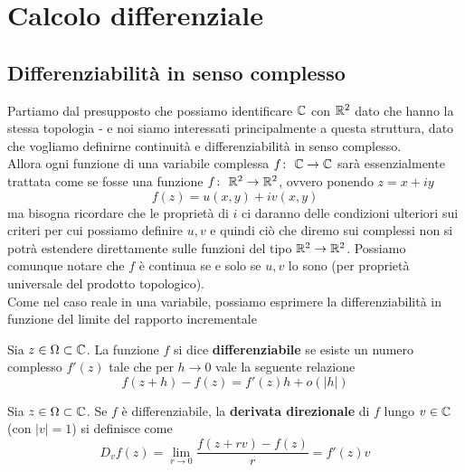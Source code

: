 \chapter{Calcolo differenziale}

\section{Differenziabilità in senso complesso}

Partiamo dal presupposto che possiamo identificare $\mathbb{C}$ con $\mathbb{R}^2$ dato che hanno la stessa topologia - e noi siamo interessati principalmente a questa struttura, dato che vogliamo definirne continuità e  differenziabilità in senso complesso. \\ Allora ogni funzione di una variabile complessa $f \colon\ \mathbb{C} \rightarrow \mathbb{C}$ sarà essenzialmente trattata come se fosse una funzione $f \colon\ \mathbb{R}^2 \rightarrow \mathbb{R}^2$, ovvero ponendo $z = x + iy$
\begin{equation}
	f(z) = u(x,y) + iv(x,y)
\end{equation}
ma bisogna ricordare che le proprietà di $i$ ci daranno delle condizioni ulteriori sui criteri per cui possiamo definire $u, v$ e quindi ciò che diremo sui complessi non si potrà estendere direttamente sulle funzioni del tipo $\mathbb{R}^2 \to \mathbb{R}^2$. Possiamo comunque notare che $f$ è continua se e solo se $u,v$ lo sono (per proprietà universale del prodotto topologico).\\

Come nel caso reale in una variabile, possiamo esprimere la differenziabilità in funzione del limite del rapporto incrementale

\begin{definition}
	Sia $z \in \Omega \subset \mathbb{C}$. La funzione $f$ si dice \textbf{differenziabile} se esiste un numero complesso $f'(z)$ tale che per $h \to 0$ vale la seguente relazione
	\begin{equation}
		f(z+ h) - f(z) = f'(z)h + o(|h|)
	\end{equation} 
\end{definition}

\begin{definition}
	Sia $z \in \Omega \subset \mathbb{C}$. Se $f$ è differenziabile, la \textbf{derivata direzionale} di $f$ lungo $v \in \mathbb{C}$ (con $|v| = 1$) si definisce come
	\begin{equation}
		D_v f(z) = \lim_{r \to 0} \frac{f(z + rv) - f(z)}{r} = f'(z) v
	\end{equation}
\end{definition}


